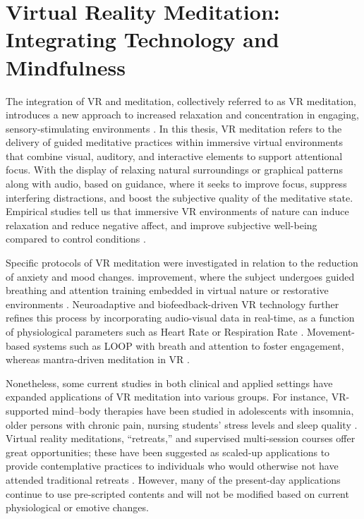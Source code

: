 \section{Virtual Reality Meditation: Integrating Technology and Mindfulness}
The integration of VR and meditation, collectively referred to as VR meditation, introduces a new approach to increased relaxation and concentration in engaging, sensory-stimulating environments \cite{liszio2018nature}. In this thesis, VR meditation refers to the delivery of guided meditative practices within immersive virtual environments that combine visual, auditory, and interactive elements to support attentional focus. With the display of relaxing natural surroundings or graphical patterns along with audio, based on guidance, where it seeks to improve focus, suppress interfering distractions, and boost the subjective quality of the meditative state\cite{liszio2018nature,tarrant2018virtual}. Empirical studies tell us that immersive VR environments of nature can induce relaxation and reduce
negative affect, and improve subjective well-being compared to control conditions \cite{liszio2018nature}.

Specific protocols of VR meditation were investigated in relation to the reduction of anxiety and mood changes. improvement, where the subject undergoes guided breathing and attention training embedded in virtual nature or restorative environments \cite{tarrant2018virtual,blum2019vrbreathing}. Neuroadaptive and biofeedback-driven VR technology further refines this process by incorporating audio-visual data in real-time, as a function of physiological parameters such as Heart Rate or Respiration Rate \cite{kosunen2016neuroadaptive,weibel2020biofeedback,brief2025vrbiofeedback}. Movement-based systems such as LOOP with breath and attention to foster engagement, whereas mantra-driven meditation in VR \cite{garg2024vrmantra}.

Nonetheless, some current studies in both clinical and applied settings have expanded applications of VR meditation into various groups. For instance, VR-supported mind–body therapies have been studied in adolescents with insomnia, older persons with chronic pain, nursing students' stress levels and sleep quality  \cite{zambotti2022insomnia,sarkar2022vrpain,kim2024stress}. Virtual reality meditations, “retreats,” and supervised multi-session courses offer great opportunities; these have been suggested as scaled-up applications to provide contemplative practices to individuals who would otherwise not have attended traditional retreats \cite{ma2022vrmindfulness}. However, many of the present-day applications continue to use pre-scripted contents and will not be modified based on current physiological or emotive changes.

